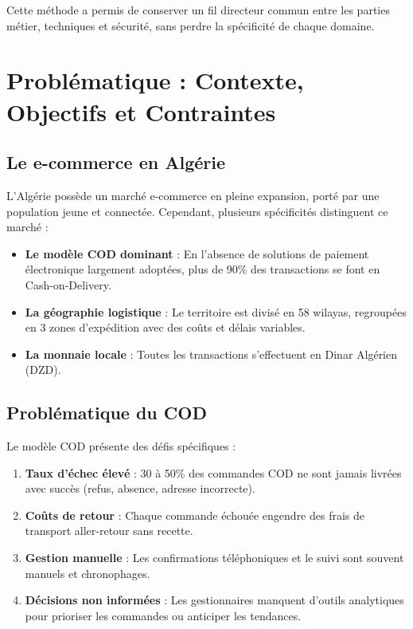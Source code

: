 \documentclass[12pt,a4paper]{report}
\begin{document}
Cette m\'{e}thode a permis de conserver un fil directeur commun entre les parties m\'{e}tier, techniques et s\'{e}curit\'{e}, sans perdre la sp\'{e}cificit\'{e} de chaque domaine.


\chapter{Probl\'{e}matique : Contexte, Objectifs et Contraintes}

\section{Le e-commerce en Alg\'{e}rie}

L'Alg\'{e}rie poss\`{e}de un march\'{e} e-commerce en pleine expansion, port\'{e} par une population jeune et connect\'{e}e. Cependant, plusieurs sp\'{e}cificit\'{e}s distinguent ce march\'{e} :

\begin{itemize}
  \item \textbf{Le mod\`{e}le COD dominant} : En l'absence de solutions de paiement \'{e}lectronique largement adopt\'{e}es, plus de 90\% des transactions se font en Cash-on-Delivery.
  \item \textbf{La g\'{e}ographie logistique} : Le territoire est divis\'{e} en 58 wilayas, regroup\'{e}es en 3 zones d'exp\'{e}dition avec des co\^{u}ts et d\'{e}lais variables.
  \item \textbf{La monnaie locale} : Toutes les transactions s'effectuent en Dinar Alg\'{e}rien (DZD).
\end{itemize}

\section{Probl\'{e}matique du COD}

Le mod\`{e}le COD pr\'{e}sente des d\'{e}fis sp\'{e}cifiques :

\begin{enumerate}
  \item \textbf{Taux d'\'{e}chec \'{e}lev\'{e}} : 30 \`{a} 50\% des commandes COD ne sont jamais livr\'{e}es avec succ\`{e}s (refus, absence, adresse incorrecte).
  \item \textbf{Co\^{u}ts de retour} : Chaque commande \'{e}chou\'{e}e engendre des frais de transport aller-retour sans recette.
  \item \textbf{Gestion manuelle} : Les confirmations t\'{e}l\'{e}phoniques et le suivi sont souvent manuels et chronophages.
  \item \textbf{D\'{e}cisions non inform\'{e}es} : Les gestionnaires manquent d'outils analytiques pour prioriser les commandes ou anticiper les tendances.
\end{enumerate}
\end{document}
